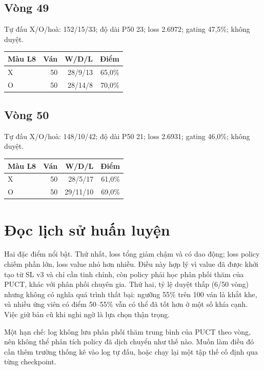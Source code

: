 \subsection*{Vòng 49}

Tự đấu X/O/hoà: 152/15/33; độ dài P50 23; loss 2.6972; gating 47,5\%; không duyệt.

\begin{center}\scriptsize\begin{tabular}{@{}lrrr@{}}\toprule

Màu L8 & Ván & W/D/L & Điểm \\

\midrule

X & 50 & 28/9/13 & 65,0\% \\

O & 50 & 28/14/8 & 70,0\% \\

\bottomrule\end{tabular}\end{center}

\subsection*{Vòng 50}

Tự đấu X/O/hoà: 148/10/42; độ dài P50 21; loss 2.6931; gating 46,0\%; không duyệt.

\begin{center}\scriptsize\begin{tabular}{@{}lrrr@{}}\toprule

Màu L8 & Ván & W/D/L & Điểm \\

\midrule

X & 50 & 28/5/17 & 61,0\% \\

O & 50 & 29/11/10 & 69,0\% \\

\bottomrule\end{tabular}\end{center}

\section{Đọc lịch sử huấn luyện}

Hai đặc điểm nổi bật. Thứ nhất, loss tổng giảm chậm và có dao động; loss policy chiếm phần lớn, loss value nhỏ hơn nhiều. Điều này hợp lý vì value đã được khởi tạo từ SL v3 và chỉ cần tinh chỉnh, còn policy phải học phân phối thăm của PUCT, khác với phân phối chuyên gia. Thứ hai, tỷ lệ duyệt thấp (6/50 vòng) nhưng không có nghĩa quá trình thất bại: ngưỡng 55\% trên 100 ván là khắt khe, và nhiều ứng viên có điểm 50--55\% vẫn có thể đã tốt hơn ở một số khía cạnh. Việc giữ bản cũ khi nghi ngờ là lựa chọn thận trọng.

Một hạn chế: log không lưu phân phối thăm trung bình của PUCT theo vòng, nên không thể phân tích policy đã dịch chuyển như thế nào. Muốn làm điều đó cần thêm trường thống kê vào log tự đấu, hoặc chạy lại một tập thế cố định qua từng checkpoint.